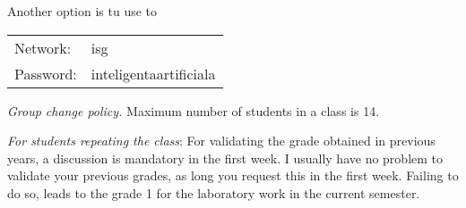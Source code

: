\begin{enumerate}
\begin{center}
\item Another option is tu use to

\begin{tabular}{ll}
Network: & isg\\
Password: & inteligentaartificiala\\
\end{tabular}
\end{center}

\item {\it Group change policy.} Maximum number of students in a class is 14.


\item {\it For students repeating the class}: 
For validating the grade obtained in previous years, a discussion is mandatory in the first week. 
I usually have no problem to validate your previous grades, as long you request this in the first week. 
Failing to do so, leads to the grade 1 for the laboratory work in the current semester.


\end{enumerate}




